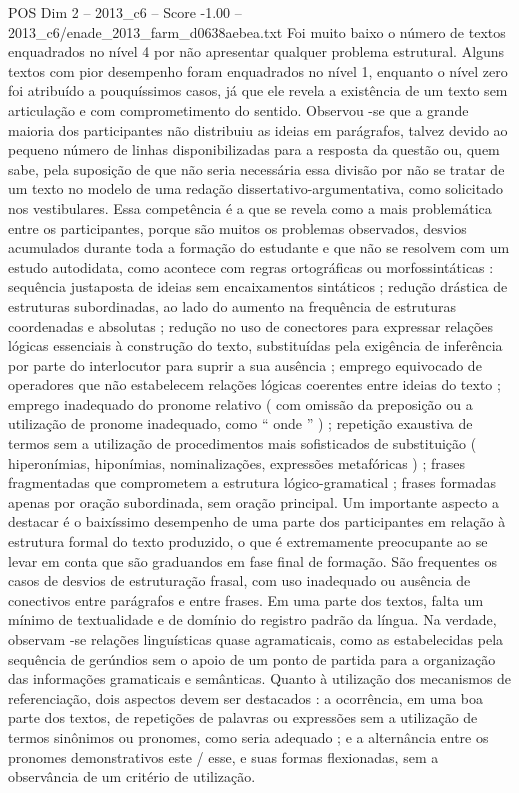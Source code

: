 \begin{textsample}{POS Dim 2 – 2013\_c6 – Score -1.00 – 2013\_c6/enade\_2013\_farm\_d0638aebea.txt}
Foi muito baixo o número de textos enquadrados no nível 4 por não apresentar qualquer problema estrutural.
Alguns textos com pior desempenho foram enquadrados no nível 1, enquanto o nível zero foi atribuído a pouquíssimos casos, já que ele revela a existência de um texto sem articulação e com comprometimento do sentido.
Observou -se que a grande maioria dos participantes não distribuiu as ideias em parágrafos, talvez devido ao pequeno número de linhas disponibilizadas para a resposta da questão ou, quem sabe, pela suposição de que não seria necessária essa divisão por não se tratar de um texto no modelo de uma redação dissertativo-argumentativa, como solicitado nos vestibulares.
Essa competência é a que se revela como a mais problemática entre os participantes, porque são muitos os problemas observados, desvios acumulados durante toda a formação do estudante e que não se resolvem com um estudo autodidata, como acontece com regras ortográficas ou morfossintáticas : sequência justaposta de ideias sem encaixamentos sintáticos ; redução drástica de estruturas subordinadas, ao lado do aumento na frequência de estruturas coordenadas e absolutas ; redução no uso de conectores para expressar relações lógicas essenciais à construção do texto, substituídas pela exigência de inferência por parte do interlocutor para suprir a sua ausência ; emprego equivocado de operadores que não estabelecem relações lógicas coerentes entre ideias do texto ; emprego inadequado do pronome relativo ( com omissão da preposição ou a utilização de pronome inadequado, como “ onde ” ) ; repetição exaustiva de termos sem a utilização de procedimentos mais sofisticados de substituição ( hiperonímias, hiponímias, nominalizações, expressões metafóricas ) ; frases fragmentadas que comprometem a estrutura lógico-gramatical ; frases formadas apenas por oração subordinada, sem oração principal.
Um importante aspecto a destacar é o baixíssimo desempenho de uma parte dos participantes em relação à estrutura formal do texto produzido, o que é extremamente preocupante ao se levar em conta que são graduandos em fase final de formação.
São frequentes os casos de desvios de estruturação frasal, com uso inadequado ou ausência de conectivos entre parágrafos e entre frases.
Em uma parte dos textos, falta um mínimo de textualidade e de domínio do registro padrão da língua.
Na verdade, observam -se relações linguísticas quase agramaticais, como as estabelecidas pela sequência de gerúndios sem o apoio de um ponto de partida para a organização das informações gramaticais e semânticas.
Quanto à utilização dos mecanismos de referenciação, dois aspectos devem ser destacados : a ocorrência, em uma boa parte dos textos, de repetições de palavras ou expressões sem a utilização de termos sinônimos ou pronomes, como seria adequado ; e a alternância entre os pronomes demonstrativos este / esse, e suas formas flexionadas, sem a observância de um critério de utilização.

\end{textsample}
